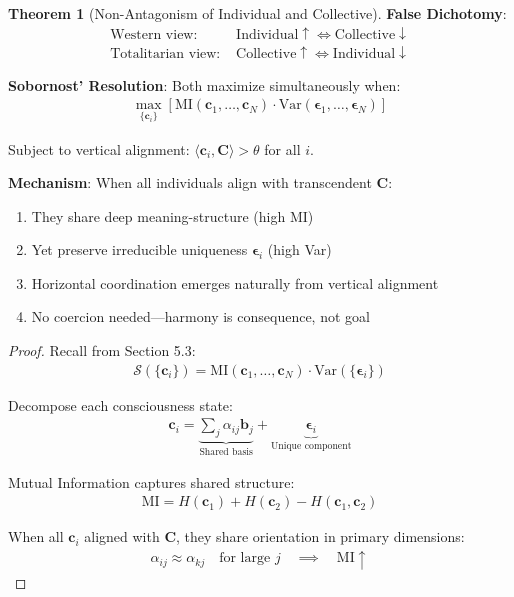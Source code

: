 \documentclass[11pt,a4paper]{article}
\theoremstyle{definition}
\newtheorem{theorem}{Theorem}[section]
\theoremstyle{remark}
\newcommand{\bb}{\mathbf{b}}
\newcommand{\cc}{\mathbf{c}}
\begin{document}
\begin{enumerate}
\begin{theorem}[Non-Antagonism of Individual and Collective]
\textbf{False Dichotomy}:
\begin{align}
\text{Western view: } &\text{Individual} \uparrow \iff \text{Collective} \downarrow \\
\text{Totalitarian view: } &\text{Collective} \uparrow \iff \text{Individual} \downarrow
\end{align}

\textbf{Sobornost' Resolution}: Both maximize simultaneously when:
\begin{align}
\max_{\{\cc_i\}} \left[\text{MI}(\cc_1, \ldots, \cc_N) \cdot \text{Var}(\boldsymbol{\epsilon}_1, \ldots, \boldsymbol{\epsilon}_N)\right]
\end{align}

Subject to vertical alignment: \(\langle \cc_i, \mathbf{C} \rangle > \theta\) for all \(i\).

\textbf{Mechanism}: When all individuals align with transcendent \(\mathbf{C}\):
\begin{enumerate}
    \item They share deep meaning-structure (high MI)
    \item Yet preserve irreducible uniqueness \(\boldsymbol{\epsilon}_i\) (high Var)
    \item Horizontal coordination emerges naturally from vertical alignment
    \item No coercion needed—harmony is consequence, not goal
\end{enumerate}
\end{theorem}

\begin{proof}
Recall from Section 5.3:
\begin{align}
\mathcal{S}(\{\cc_i\}) = \text{MI}(\cc_1, \ldots, \cc_N) \cdot \text{Var}(\{\boldsymbol{\epsilon}_i\})
\end{align}

Decompose each consciousness state:
\begin{align}
\cc_i = \underbrace{\sum_j \alpha_{ij} \bb_j}_{\text{Shared basis}} + \underbrace{\boldsymbol{\epsilon}_i}_{\text{Unique component}}
\end{align}

Mutual Information captures shared structure:
\begin{align}
\text{MI} = H(\cc_1) + H(\cc_2) - H(\cc_1, \cc_2)
\end{align}

When all \(\cc_i\) aligned with \(\mathbf{C}\), they share orientation in primary dimensions:
\begin{align}
\alpha_{ij} \approx \alpha_{kj} \quad \text{for large } j \quad \implies \quad \text{MI} \uparrow
\end{align}


\end{proof}
\end{enumerate}
\end{document}
